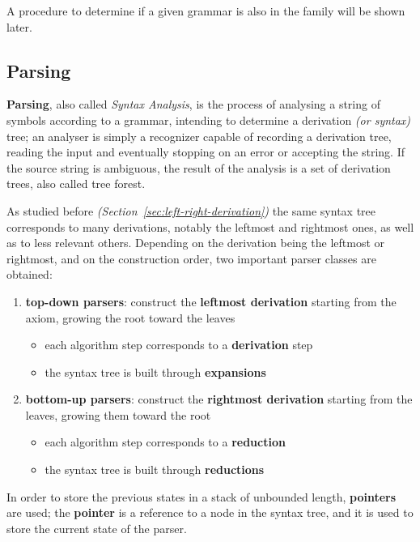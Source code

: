 \documentclass[english]{article}
\begin{document}
A procedure to determine if a given \CF grammar is also in the \DET family will be shown later. %

\subsection{Parsing}
\label{sec:parsing}

\textbf{Parsing}, also called \textit{Syntax Analysis}, is the process of analysing a string of symbols according to a grammar, intending to determine a derivation \textit{(or syntax)} tree;
an analyser is simply a recognizer capable of recording a derivation tree, reading the input and eventually stopping on an error or accepting the string.
If the source string is ambiguous, the result of the analysis is a set of derivation trees, also called tree forest.

As studied before \textit{(Section~\ref{sec:left-right-derivation})}
the same syntax tree corresponds to many derivations, notably the leftmost and rightmost ones, as well as to less relevant others.
Depending on the derivation being the leftmost or rightmost, and on the construction order, two important parser classes are obtained:

\begin{enumerate}
  \item \textbf{top-down parsers}: construct the \textbf{leftmost derivation} starting from the axiom, growing the root toward the leaves
        \begin{itemize}
          \item each algorithm step corresponds to a \textbf{derivation} step
          \item the syntax tree is built through \textbf{expansions}
        \end{itemize}
  \item \textbf{bottom-up parsers}: construct the \textbf{rightmost derivation} starting from the leaves, growing them toward the root
        \begin{itemize}
          \item each algorithm step corresponds to a \textbf{reduction}
          \item the syntax tree is built through \textbf{reductions}
        \end{itemize}
\end{enumerate}

\bigskip
In order to store the previous states in a stack of unbounded length, \textbf{pointers} are used;
the \textbf{pointer} is a reference to a node in the syntax tree, and it is used to store the current state of the parser.
\end{document}
